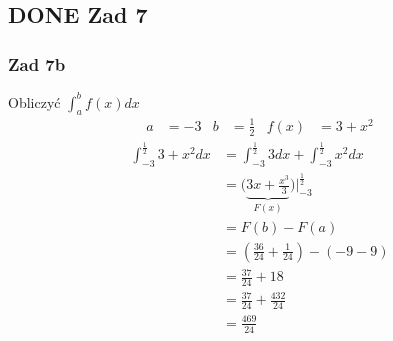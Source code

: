 \documentclass[11pt]{article}
\begin{document}
\subsection{{\bfseries\sffamily DONE} Zad 7}
\label{sec:org6b09416}
\subsubsection{Zad 7b}
\label{sec:org8bf0532}
Obliczyć \(\displaystyle\int_a^b f(x) dx\)
\begin{align*}
a &= -3 & b &= \frac{1}{2} & f(x)&=3+x^2
\end{align*}
\begin{align*}
  \int_{-3}^\frac{1}{2} 3 + x^2 dx
  &= \int_{-3}^{\frac{1}{2}}3 dx + \int_{-3}^{\frac{1}{2}} x^{2} dx
  \\
  &= \Big ( \underbrace{ 3x + \frac{x^{3}}{3} }_{F(x)} \Big) \Bigg|_{-3}^{\frac{1}{2}}
  \\
  &= F(b) - F(a)
  \\
  &= \left(\frac{36}{24} + \frac{1}{24} \right) - (-9 -9)
  \\
  &= \frac{37}{24} + 18
  \\
  &= \frac{37}{24} + \frac{432}{24}
  \\
  &=\frac{469}{24}
\end{align*}
\end{document}
